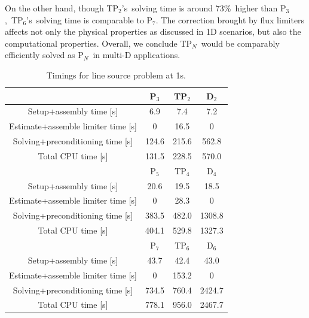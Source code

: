 \documentclass[review]{elsarticle}
\newcommand{\pn}{P$_N$}
\begin{document}
{
On the other hand, though TP$_2$'s\ solving time is around 73\%\ higher than P$_3$,\ TP$_6$'s\ solving time is comparable to P$_7$. The correction brought by flux limiters affects not only the physical properties as discussed in 1D scenarios, but also the computational properties. %
Overall, we conclude T\pn\ would be comparably efficiently solved as \pn\ in multi-D applications.
\begin{table}[h]
	\centering
	\caption{Timings for line source problem at 1s.}
	\label{t:cpu_time}
	\begin{tabular}{|c|c|c|c|}
		\hline
		& P$_3$ & TP$_{2}$ & D$_{2}$\\
		\hline
Setup+assembly time [s] & 6.9 & 7.4 & 7.2\\
\hline
		Estimate+assemble limiter time [s]& 0 & 16.5 & 0 \\
		\hline
		Solving+preconditioning time [s]& 124.6 & 215.6 & 562.8 \\
		\hline
		Total CPU time [s]& 131.5  & 228.5 & 570.0\\
		\hline
		\hline
		& P$_5$ & TP$_{4}$ & D$_{4}$\\
		\hline
Setup+assembly time [s] & 20.6  & 19.5 & 18.5\\
\hline
Estimate+assemble limiter time [s]& 0 & 28.3 & 0 \\
\hline
Solving+preconditioning time [s]& 383.5 & 482.0 &  1308.8\\
\hline
	Total CPU time [s]& 404.1 & 529.8 & 1327.3\\
		\hline
		\hline
		& P$_7$ & TP$_{6}$ & D$_{6}$\\
		\hline
		Setup+assembly time [s] & 43.7  & 42.4 & 43.0\\
		\hline
		Estimate+assemble limiter time [s]& 0 & 153.2 & 0 \\
		\hline
		Solving+preconditioning time [s]& 734.5 & 760.4 & 2424.7 \\
		\hline
		Total CPU time [s]& 778.1 & 956.0 & 2467.7\\
		\hline
	\end{tabular}
\end{table}
	}
\end{document}
